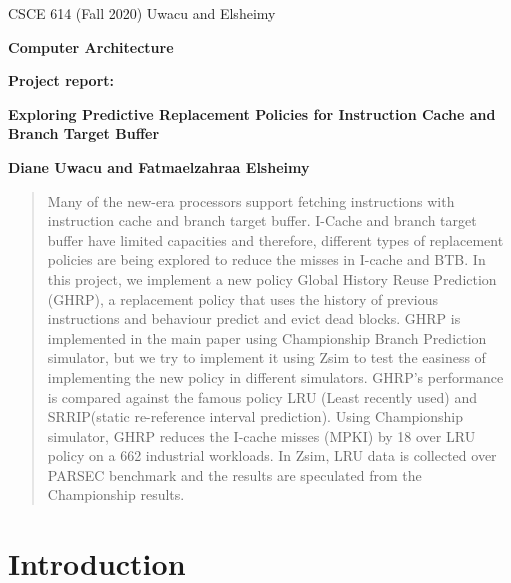\documentclass[11pt]{article}
\begin{document}
\centerline{CSCE 614 (Fall 2020) \hfill Uwacu and Elsheimy}
\medskip
\centerline{\bf Computer Architecture}
\medskip

\centerline{\bf  Project report: }

\bigskip

\centerline{\bf Exploring Predictive Replacement Policies for Instruction Cache and Branch Target Buffer}

\bigskip

\centerline{\bf Diane Uwacu and Fatmaelzahraa Elsheimy}

\bigskip

\begin{abstract}
Many of the new-era processors support fetching instructions with instruction cache and branch target buffer. I-Cache and branch target buffer have limited capacities and
therefore, different types of replacement policies are being explored to reduce the misses in I-cache and BTB. In this project, we implement a new policy Global History Reuse 
Prediction (GHRP), a replacement policy that uses the history of previous instructions and behaviour predict and evict dead blocks. GHRP is implemented in the main paper using
Championship Branch Prediction simulator, but we try to implement it using Zsim to test the easiness of implementing the new policy in different simulators. GHRP’s performance
is compared against the famous policy LRU (Least recently used) and SRRIP(static re-reference interval prediction). Using Championship simulator, GHRP reduces the I-cache misses (MPKI) by 18%
over LRU policy on a 662 industrial workloads. In Zsim, LRU data is collected over PARSEC benchmark and the results are speculated from the Championship results.
\end{abstract}

\section{Introduction} 
\label{sec:introduction}
\end{document}
